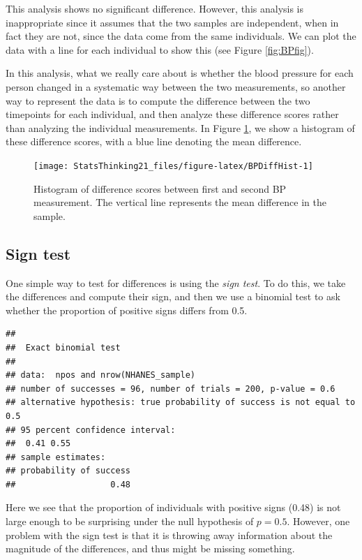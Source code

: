 \documentclass[12pt,]{book}
\theoremstyle{definition}
\theoremstyle{definition}
\theoremstyle{definition}
\theoremstyle{remark}
\begin{document}
This analysis shows no significant difference. However, this analysis is inappropriate since it assumes that the two samples are independent, when in fact they are not, since the data come from the same individuals. We can plot the data with a line for each individual to show this (see Figure \ref{fig:BPfig}).

In this analysis, what we really care about is whether the blood pressure for each person changed in a systematic way between the two measurements, so another way to represent the data is to compute the difference between the two timepoints for each individual, and then analyze these difference scores rather than analyzing the individual measurements. In Figure \ref{fig:BPDiffHist}, we show a histogram of these difference scores, with a blue line denoting the mean difference.

\begin{figure}
\texttt{[image: StatsThinking21\_files/figure-latex/BPDiffHist-1]} \caption{Histogram of difference scores between first and second BP measurement. The vertical line represents the mean difference in the sample.}\label{fig:BPDiffHist}
\end{figure}

\hypertarget{sign-test}{%
\subsection{Sign test}\label{sign-test}}

One simple way to test for differences is using the \emph{sign test}. To do this, we take the differences and compute their sign, and then we use a binomial test to ask whether the proportion of positive signs differs from 0.5.

\begin{verbatim}
## 
##  Exact binomial test
## 
## data:  npos and nrow(NHANES_sample)
## number of successes = 96, number of trials = 200, p-value = 0.6
## alternative hypothesis: true probability of success is not equal to 0.5
## 95 percent confidence interval:
##  0.41 0.55
## sample estimates:
## probability of success 
##                   0.48
\end{verbatim}

Here we see that the proportion of individuals with positive signs (0.48) is not large enough to be surprising under the null hypothesis of \(p=0.5\). However, one problem with the sign test is that it is throwing away information about the magnitude of the differences, and thus might be missing something.
\end{document}
